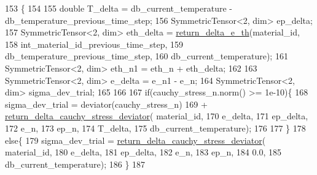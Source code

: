 \begin{DoxyCode}
153                                                                           \{
154 
155         \textcolor{keywordtype}{double} T\_delta = db\_current\_temperature - db\_temperature\_previous\_time\_step;
156         SymmetricTensor<2, dim> ep\_delta;
157         SymmetricTensor<2, dim> eth\_delta = \hyperlink{classConstitutive__Laws_1_1Thermo__Elasto__Plastic_aa0d53eb09b8f27ade4b504ba92c67a73}{return\_delta\_e\_th}(material\_id,
158                                                               int\_material\_id\_previous\_time\_step,
159                                                               db\_temperature\_previous\_time\_step,
160                                                               db\_current\_temperature);
161         SymmetricTensor<2, dim> eth\_n1 = eth\_n + eth\_delta;
162 
163         SymmetricTensor<2, dim> e\_delta = e\_n1 - e\_n;
164         SymmetricTensor<2, dim> sigma\_dev\_trial;
165 
166 
167         \textcolor{keywordflow}{if}(cauchy\_stress\_n.norm() >= 1e-10)\{
168             sigma\_dev\_trial = deviator(cauchy\_stress\_n)
169                               + \hyperlink{classConstitutive__Laws_1_1Thermo__Elasto__Plastic_af1cc15583d72208ac71ef846769744ca}{return\_delta\_cauchy\_stress\_deviator}(
      material\_id,
170                                                                     e\_delta,
171                                                                     ep\_delta,
172                                                                     e\_n,
173                                                                     ep\_n,
174                                                                     T\_delta,
175                                                                     db\_current\_temperature);
176 
177         \}
178         \textcolor{keywordflow}{else}\{
179             sigma\_dev\_trial = \hyperlink{classConstitutive__Laws_1_1Thermo__Elasto__Plastic_af1cc15583d72208ac71ef846769744ca}{return\_delta\_cauchy\_stress\_deviator}(
      material\_id,
180                                                                   e\_delta,
181                                                                   ep\_delta,
182                                                                   e\_n,
183                                                                   ep\_n,
184                                                                   0.0,
185                                                                   db\_current\_temperature);
186         \}
187 

\end{DoxyCode}
